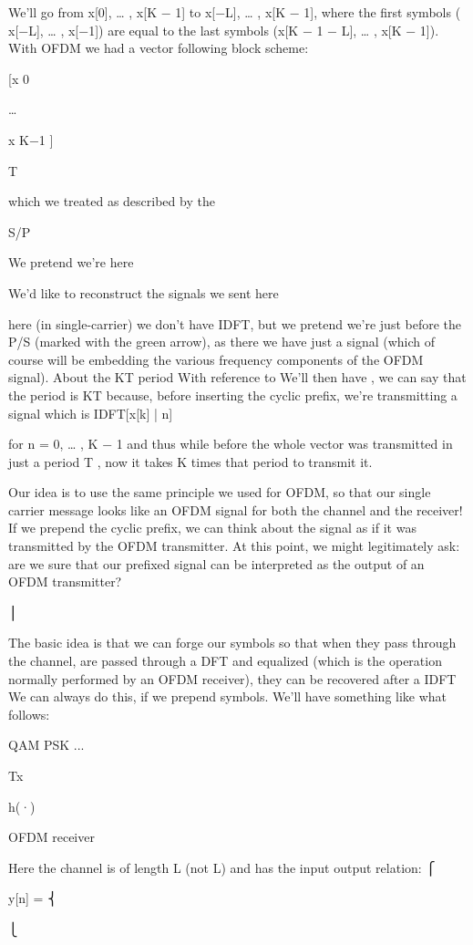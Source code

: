 {We'll go from x[0], … , x[K − 1] to x[−L], … , x[K − 1], where the first symbols (
x[−L], … , x[−1]) are equal to the last symbols (x[K − 1 − L], … , x[K − 1]).
With OFDM we had a vector following block scheme:

[x 0

…

x K−1 ]

T

which we treated as described by the

S/P

We pretend we're here

We'd like to reconstruct the signals we sent here

here (in single-carrier) we don't have IDFT, but we pretend we're just before the P/S
(marked with the green arrow), as there we have just a signal (which of course will be embedding the various frequency components of the OFDM signal).
​About the KT period With reference to We'll then have
, we can say that the period is KT because, before inserting the cyclic prefix,
we're transmitting a signal which is IDFT[x[k] | n]

for n = 0, … , K − 1 and thus while before the whole vector was transmitted in just a period T , now it takes K times that period to transmit it.

Our idea is to use the same principle we used for OFDM, so that our single carrier message looks like an OFDM signal for both the channel and the receiver!
If we prepend the cyclic prefix, we can think about the signal as if it was transmitted by the OFDM transmitter. At this point, we might legitimately ask: are we sure that our prefixed signal can be interpreted as the output of an OFDM transmitter?

⎪

The basic idea is that we can forge our symbols so that when they pass through the channel, are passed through a DFT and equalized (which is the operation normally performed by an OFDM receiver), they can be recovered after a IDFT We can always do this, if we prepend symbols.
We'll have something like what follows:

QAM PSK
...

Tx

h(·)

OFDM receiver

Here the channel is of length L (not L) and has the input output relation:
⎧

y[n] = ⎨

⎩

}
